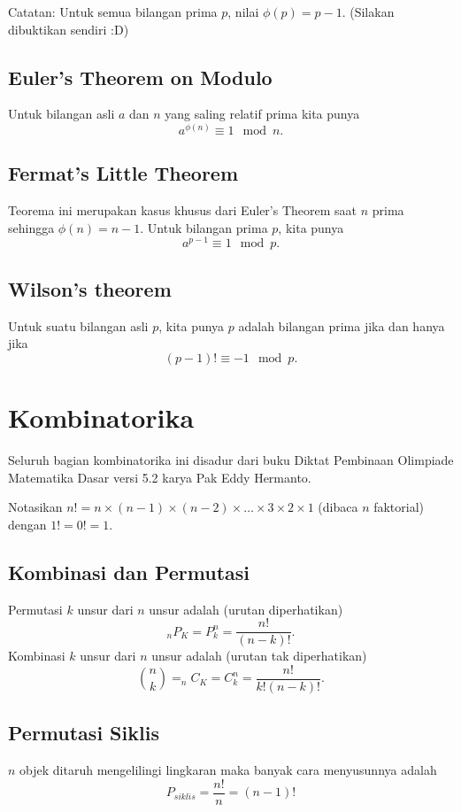 \documentclass[11pt]{scrartcl}
\begin{document}
        Catatan: Untuk semua bilangan prima $p$, nilai $\phi(p) = p-1$. (Silakan dibuktikan sendiri :D)
        
        \subsection{Euler's Theorem on Modulo}
        Untuk bilangan asli $a$ dan $n$ yang saling relatif prima kita punya
        $$a^{\phi(n)} \equiv 1 \mod n.$$
        
        \subsection{Fermat's Little Theorem}
        Teorema ini merupakan kasus khusus dari Euler's Theorem saat $n$ prima sehingga $\phi(n)=n-1$. Untuk bilangan prima $p$, kita punya
        $$a^{p-1} \equiv 1 \mod p.$$
        
        \subsection{Wilson's theorem}
        Untuk suatu bilangan asli $p$, kita punya $p$ adalah bilangan prima jika dan hanya jika
        $$(p-1)! \equiv -1 \mod p.$$
   
    \section{Kombinatorika}
    Seluruh bagian kombinatorika ini disadur dari buku Diktat Pembinaan Olimpiade Matematika Dasar versi 5.2 karya Pak Eddy Hermanto.
    
     Notasikan $n!=n \times (n-1) \times (n-2) \times \dots \times 3 \times 2 \times 1$ (dibaca $n$ faktorial) dengan $1!=0!=1$.
        
        \subsection{Kombinasi dan Permutasi}
        Permutasi $k$ unsur dari $n$ unsur adalah (urutan diperhatikan)
        $$_nP_K = P_k^n = \dfrac{n!}{(n-k)!}.$$
        Kombinasi $k$ unsur dari $n$ unsur adalah (urutan tak diperhatikan)
        $${n \choose k}=_nC_K = C_k^n = \dfrac{n!}{k!(n-k)!}.$$
        
        \subsection{Permutasi Siklis}
        $n$ objek ditaruh mengelilingi lingkaran maka banyak cara menyusunnya adalah
        $$P_{siklis} =\dfrac{n!}{n} = (n-1)!$$
        
\end{document}
